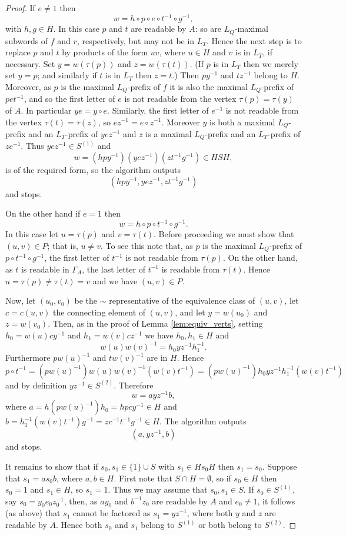 \documentclass[a4paper,12pt]{article}
\newcommand{\G}{\Gamma }
\renewcommand{\t}{\tau }
\numberwithin{equation}{section}
\numberwithin{figure}{section}
\begin{document}
\begin{proof}
If $e\neq 1$ then
\[w=h\circ p \circ e\circ t^{-1}\circ g^{-1},\]
with $h,g\in H$. In this case $p$ and $t$ are readable by $A$:
so are $L_Q$-maximal subwords of $f$ and $r$, respectively, but
may not be in $L_T$. Hence the next step is to replace $p$ and $t$ by
products of the form $uv$, where $u\in H$ and  $v$ is in $L_T$,
 if necessary.
Set $y=w(\t(p))$ and  $z=w(\t(t))$. (If $p$ is in $L_T$ then we
merely set $y=p$; and similarly if $t$ is in $L_T$ then $z=t$.)
Then $py^{-1}$ and $tz^{-1}$ belong to $H$. Moreover, as $p$
is the maximal $L_Q$-prefix of $f$ it is also the maximal
$L_Q$-prefix of $pet^{-1}$,  and so
  the
first letter of $e$ is not readable from the vertex $\t(p)=\t(y)$
of $A$. In
particular $ye=y\circ e$. Similarly, the first letter of $e^{-1}$
is not readable from the vertex $\t(t)=\t(z)$, so $ez^{-1}=e\circ
z^{-1}$. Moreover $y$ is both a maximal $L_Q$-prefix  and an
$L_T$-prefix of $yez^{-1}$ and $z$ is a maximal $L_Q$-prefix  and
an $L_T$-prefix of $ze^{-1}$. Thus $yez^{-1}\in S^{(1)}$ and 
\[w=(h py^{-1}) (yez^{-1})(zt^{-1} g^{-1})\in HSH,\]
is of the required form, 
so the algorithm outputs 
\[(h py^{-1},yez^{-1},zt^{-1} g^{-1})\]
and stops.

On the other hand if $e=1$ then
\[w=h\circ p\circ t^{-1}\circ g^{-1}.\]
In this case let $u=\t(p)$ and $v=\t(t)$.
Before proceeding we must show that $(u,v)\in P$; that is, $u\neq v$. 
To see this note that, as $p$ is the maximal $L_Q$-prefix of 
$p\circ t^{-1}\circ g^{-1}$, the first letter of $t^{-1}$ is not
readable from $\t(p)$. On the other hand, as $t$ is readable in $\G_A$,
the last letter of $t^{-1}$ is readable from $\t(t)$. Hence $u=\t(p)\neq
\t(t)=v$ and we have $(u,v)\in P$. 

Now, let $(u_0,v_0)$ be the $\sim$ representative
of the equivalence class of $(u,v)$, let $c=c(u,v)$ the connecting element of 
$(u,v)$, and let 
 $y=w(u_0)$ and $z=w(v_0)$. Then,  as in the proof of Lemma
\ref{lem:equiv_verts}, setting $h_0=w(u)cy^{-1}$ and
$h_1=w(v)cz^{-1}$ we have
 $h_0,h_1\in H$ and
\[w(u)w(v)^{-1}=h_0yz^{-1}h_1^{-1}.\] Furthermore
 $p w(u)^{-1}$ and  $t w(v)^{-1}$ are in $H$. Hence
\[
p\circ t^{-1}=( p w(u)^{-1})w(u)w(v)^{-1}( w(v)t^{-1})=( p w(u)^{-1}) h_0 yz^{-1}
h_1^{-1}( w(v)t^{-1})
\]
and by definition $yz^{-1}\in S^{(2)}$. Therefore 
\[w=a yz^{-1} b,\]
where $a=h ( p w(u)^{-1}) h_0=hpcy^{-1}\in H$ and $b=h_1^{-1}( w(v)t^{-1})g^{-1}
=zc^{-1}t^{-1}g^{-1}\in H$. The algorithm outputs 
\[(a, yz^{-1}, b)\]
and stops. 

It remains to show that if $s_0,s_1\in \{1\}\cup S$ with $s_1\in Hs_0H$
then $s_1=s_0$. Suppose that $s_1=as_0b$, where $a, b\in H$.
First note that $S\cap H=\emptyset$, so if $s_0\in H$ then $s_0=1$ and 
$s_1\in H$, so $s_1=1$. 
 Thus we may assume that $s_0,s_1\in S$. 
 If
$s_0\in S^{(1)}$, say $s_0=y_0e_0z_0^{-1}$, then, as $ay_0$ and
$b^{-1}z_0$ are readable by $A$ and $e_0\neq 1$, it follows (as
above) that $s_1$ cannot be factored as $s_1=yz^{-1}$, where both
$y$ and $z$ are readable by $A$. Hence both $s_0$ and $s_1$ belong
to $S^{(1)}$ or both belong to $S^{(2)}$.


\end{proof}
\end{document}
